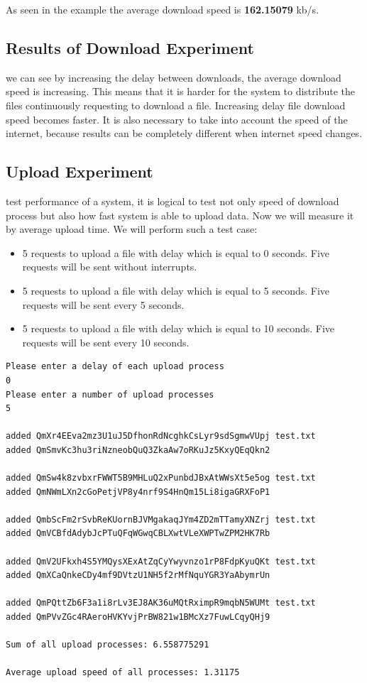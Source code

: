 \documentclass[a4paper,12pt,fleqn]{article}
\begin{document}
As seen in the example the average download speed is \textbf{162.15079} kb/s.

\subsection{Results of Download Experiment}
 we can see by increasing the delay between downloads, the average download speed is increasing. This means that it is harder for the system to distribute the files continuously requesting to download a file. Increasing delay file download speed becomes faster. It is also necessary to take into account the speed of the internet, because results can be completely different when internet speed changes.




\subsection{Upload Experiment}
 test performance of a system, it is logical to test not only speed of download process but also how fast system is able to upload data. Now we will measure it by average upload time. We will perform such a test case:

\begin{itemize}
    \item 5 requests to upload a file with delay which is equal to 0 seconds. Five requests will be sent  without interrupts.
    \item 5 requests to upload a file with delay which is equal to 5 seconds. Five requests will be sent every 5 seconds.
    \item 5 requests to upload a file with delay which is equal to 10 seconds. Five requests will be sent every 10 seconds.
\end{itemize}

\begin{lstlisting}[caption={Upload test without delay.},label={abc}]
Please enter a delay of each upload process
0
Please enter a number of upload processes
5

added QmXr4EEva2mz3U1uJ5DfhonRdNcghkCsLyr9sdSgmwVUpj test.txt
added QmSmvKc3hu3riNzneobQuQ3ZkaAw7oRKuJz5KxyQEqQkn2 

added QmSw4k8zvbxrFWWT5B9MHLuQ2xPunbdJBxAtWWsXt5e5og test.txt
added QmNWmLXn2cGoPetjVP8y4nrf9S4HnQm15Li8igaGRXFoP1 

added QmbScFm2rSvbReKUornBJVMgakaqJYm4ZD2mTTamyXNZrj test.txt
added QmVCBfdAdybJcPTuQFqWGwqCBLXwtVLeXWPTwZPM2HK7Rb 

added QmV2UFkxh4S5YMQysXExAtZqCyYwyvnzo1rP8FdpKyuQKt test.txt
added QmXCaQnkeCDy4mf9DVtzU1NH5f2rMfNquYGR3YaAbymrUn 

added QmPQttZb6F3a1i8rLv3EJ8AK36uMQtRximpR9mqbN5WUMt test.txt
added QmPVvZGc4RAeroHVKYvjPrBW821w1BMcXz7FuwLCqyQHj9 

Sum of all upload processes: 6.558775291

Average upload speed of all processes: 1.31175
\end{lstlisting}    
\end{document}
